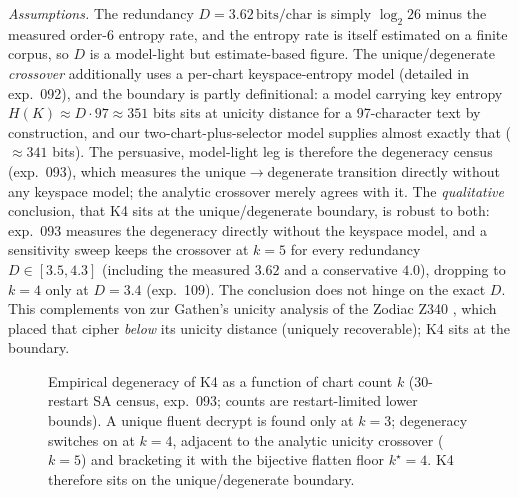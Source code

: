 \documentclass[11pt]{article}
\theoremstyle{plain}
\theoremstyle{definition}
\newcommand{\K}{\textsf{K4}}
\newcommand{\bits}{\,\text{bits/char}}
\begin{document}
\noindent
\emph{Assumptions.} The redundancy $D=3.62\bits$ is simply $\log_2 26$ minus the
measured order-6 entropy rate, and the entropy rate is itself estimated on a finite
corpus, so $D$ is a model-light but estimate-based figure. The unique/degenerate
\emph{crossover} additionally uses a per-chart keyspace-entropy model (detailed in
exp.~092), and the boundary is partly definitional: a model carrying key entropy
$H(K)\approx D\cdot97\approx351$ bits sits at unicity distance for a 97-character text
by construction, and our two-chart-plus-selector model supplies almost exactly that
(${\approx}341$ bits). The persuasive, model-light leg is therefore the degeneracy
census (exp.~093), which measures the unique$\to$degenerate transition directly
without any keyspace model; the analytic crossover merely agrees with it. The
\emph{qualitative} conclusion, that \K{} sits at the unique/degenerate
boundary, is robust to both: exp.~093 measures the degeneracy directly without the
keyspace model, and a sensitivity sweep keeps the crossover at $k=5$ for every
redundancy $D\in[3.5,4.3]$ (including the measured $3.62$ and a conservative $4.0$),
dropping to $k=4$ only at $D=3.4$ (exp.~109). The conclusion does not hinge on the
exact $D$. This complements von zur Gathen's unicity analysis of the Zodiac Z340
\cite{vonzurgathen2023}, which placed that cipher \emph{below} its unicity distance
(uniquely recoverable); \K{} sits at the boundary.

\begin{figure}[t]\centering
{}
\caption{Empirical degeneracy of \K{} as a function of chart count $k$
(30-restart SA census, exp.~093; counts are restart-limited lower bounds).
A unique fluent decrypt is found only at $k=3$; degeneracy switches on at $k=4$,
adjacent to the analytic unicity crossover ($k=5$) and bracketing it with the
bijective flatten floor $k^\star=4$. \K{} therefore sits on the unique/degenerate
boundary.}
\label{fig:degeneracy}
\end{figure}
\end{document}

